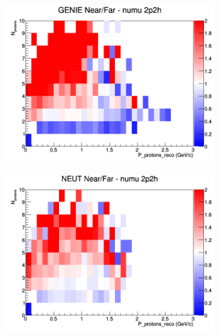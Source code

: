 \documentclass[12pt]{article}
\begin{document}
\begin{figure}[h]
\begin{subfigure}[b]{0.32\textwidth}
\includegraphics[width=\linewidth]{eff_N_P/GAr/protons/ratios/2p2h_GENIE_numu_NF_N_P.png}
\end{subfigure}
\begin{subfigure}[b]{0.32\textwidth}
\includegraphics[width=\linewidth]{eff_N_P/GAr/protons/ratios/2p2h_NEUT_numu_NF_N_P.png}
\end{subfigure}
\begin{subfigure}[b]{0.32\textwidth}

\end{subfigure}
\end{figure}
\end{document}
